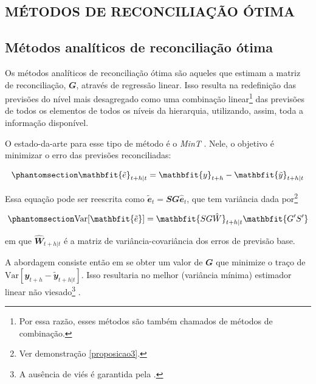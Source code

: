 \documentclass[
  12pt,
  twoside,
  openright,
  a4paper,
  chapter=TITLE,
  section=TITLE,
  brazil]{abntex2}
\begin{document}
\begin{apendicesenv}
\partapendices

\chapter{MÉTODOS DE RECONCILIAÇÃO ÓTIMA}\label{apendice_metodos_reconciliacao}

\section{Métodos analíticos de reconciliação
ótima}\label{muxe9todos-analuxedticos-de-reconciliauxe7uxe3o-uxf3tima}

Os métodos analíticos de reconciliação ótima são aqueles que estimam a
matriz de reconciliação, \(\mathbfit{G}\), através de regressão linear.
Isso resulta na redefinição das previsões do nível mais desagregado como
uma combinação linear\footnote{Por essa razão, esses métodos são também
  chamados de métodos de combinação.} das previsões de todos os
elementos de todos os níveis da hierarquia, utilizando, assim, toda a
informação disponível.

O estado-da-arte para esse tipo de método é o \emph{MinT}
\autocite{wickramasuriya_optimal_2019}. Nele, o objetivo é minimizar o
erro das previsões reconciliadas:

\begin{equation}\phantomsection\label{eq-mint1}{
\mathbfit{\tilde{e}}_{t+h|t} = \mathbfit{y}_{t+h} - \mathbfit{\tilde{y}}_{t+h|t}
}\end{equation}

Essa equação pode ser reescrita como
\(\mathbfit{\tilde{e}}_t = \mathbfit{SG\hat{e}}_t\), que tem variância
dada por\footnote{Ver demonstração \ref{proposicao3}.}

\begin{equation}\phantomsection\label{eq-mint2}{
\text{Var}[\mathbfit{\tilde{e}}] = \mathbfit{SG\hat{W}}_{t+h|t}\mathbfit{G'S'}
}\end{equation}

\noindent em que \(\mathbfit{\hat{W}}_{t+h|t}\) é a matriz de
variância-covariância dos erros de previsão base.

A abordagem consiste então em se obter um valor de \(\mathbfit{G}\) que
minimize o traço de
\(\text{Var}[\mathbfit{y}_{t+h} - \mathbfit{\tilde{y}}_{t+h|t}]\). Isso
resultaria no melhor (variância mínima) estimador linear não
viesado\footnote{A ausência de viés é garantida pela
  .} \autocite{wickramasuriya_optimal_2019}.


\end{apendicesenv}
\end{document}
